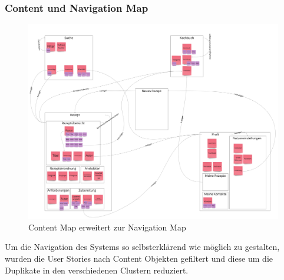 \subsubsection{Content und Navigation Map}
\begin{figure}[h] %
    \includegraphics[width=1\textwidth]{images/navigationmap.jpg}
    \caption[Content Map erweitert zur Navigation Map]{Content Map erweitert zur Navigation Map}
    \label{fig:navigationmap}
\end{figure}
Um die Navigation des Systems so selbsterklärend wie möglich zu gestalten, wurden die User Stories nach Content Objekten gefiltert und diese um die Duplikate in den verschiedenen Clustern reduziert. 
